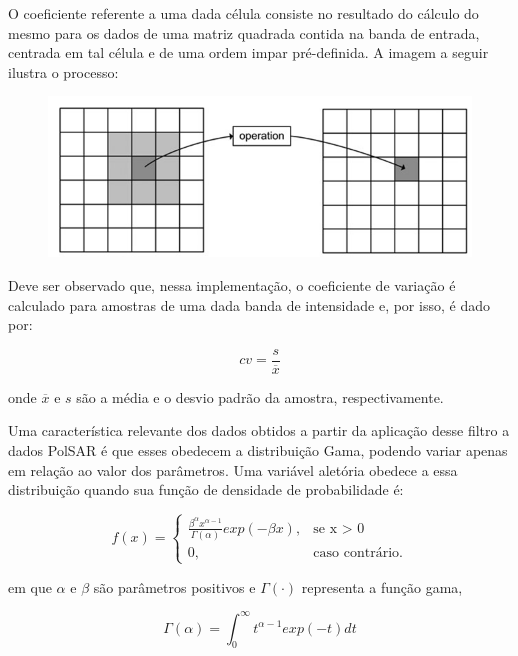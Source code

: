 \documentclass[12pt]{article}
\begin{document}
O coeficiente referente a uma dada célula consiste no resultado do cálculo do mesmo para os dados de uma matriz quadrada contida na banda de entrada, centrada em tal célula e de uma ordem impar pré-definida. A imagem a seguir ilustra o processo:

\begin{figure}[h!]
\centering \includegraphics[scale = 0.5]{../../Images/Report_29_08_18/filter.png}
\end{figure}

Deve ser observado que, nessa implementação, o coeficiente de variação é calculado para amostras de uma dada banda de intensidade e, por isso, é dado por:

\begin{displaymath}
cv = \frac{ s }{ \overline{x} }
\end{displaymath}

onde $\overline{x}$ e $s$ são a média e o desvio padrão da amostra, respectivamente.

Uma característica relevante dos dados obtidos a partir da aplicação desse filtro a dados PolSAR é que esses obedecem a distribuição Gama, podendo variar apenas em relação ao valor dos parâmetros. Uma variável aletória obedece a essa distribuição quando sua função de densidade de probabilidade é:

\begin{displaymath}
f(x) =
\begin{cases}
\frac{ \beta^{\alpha} x^{\alpha - 1} }{ \Gamma(\alpha)} exp(-\beta x), & \mbox{se x }>\mbox{ 0}\\
0, & \mbox{caso contrário.}
\end{cases}
\end{displaymath}

em que $\alpha$ e $\beta$ são parâmetros positivos e $\Gamma(\cdot)$ representa a função gama,

\begin{displaymath}
\Gamma(\alpha) = \int_{0}^{\infty} t^{\alpha - 1} exp(-t) dt
\end{displaymath}
\end{document}

